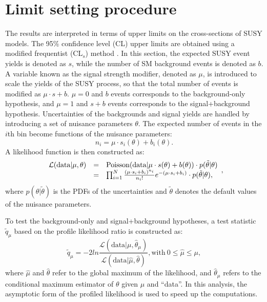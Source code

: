 \documentclass[thesis.tex]{subfiles}
\renewcommand\_{\textunderscore\allowbreak}
\begin{document}
\section{Limit setting procedure}
The results are interpreted in terms of upper limits on the cross-sections of SUSY models. 
The 95\% confidence level (CL) upper limits are obtained using a modified frequentist (CL$_s$) method \cite{Junk:1999kv,Read:2002hq,CMS-NOTE-2011-005}.
In this section, the expected SUSY event yields is denoted as $s$, while the number of SM background events is denoted as $b$. 
A variable known as the signal strength modifier, denoted as $\mu$, is introduced to scale the yields of the SUSY process, so that the total number of events is modified as $\mu \cdot s +b$. 
$\mu = 0$ and $b$ events corresponds to the background-only hypothesis, and $\mu = 1$ and $s+b$ events corresponds to the signal+background hypothesis.
Uncertainties of the backgrounds and signal yields are handled by introducing a set of nuisance parameters $\theta$.
The expected number of events in the $i$th bin become functions of the nuisance parameters: 
\begin{equation}
	n_i = \mu \cdot s_i(\theta) + b_i(\theta).
\end{equation}
A likelihood function is then constructed as:
\begin{equation}
	\begin{array}{c c l}
	\mathcal{L}( \text{data}|\mu, \theta) & = & \text{Poisson}(\text{data}|\mu \cdot s(\theta) + b(\theta)) \cdot p(\tilde{\theta} | \theta) \\
							       & = & \prod_{i=1}^N \frac{(\mu \cdot s_i + b_i)^{n_i}}{n_i !} e^{- (\mu \cdot s_i + b_i) } \cdot p(\tilde{\theta} | \theta),
	\end{array},
\end{equation}
where $p(\theta | \tilde{\theta})$ is the PDFs of the uncertainties and $\tilde{\theta}$ denotes the default values of the nuisance parameters. 

To test the background-only and signal+background hypotheses, a test statistic $\tilde{q}_\mu$ based on the profile likelihood ratio is constructed as:
\begin{equation}
	\tilde{q}_\mu = -2 ln \frac{\mathcal{L}( \text{data}|\mu, \hat{\theta}_\mu)}{\mathcal{L}( \text{data}|\hat{\mu}, \hat{\theta})}, \text{with}\  0 \le \hat{\mu} \le \mu, 
\end{equation}
where $\hat{\mu}$ and $\hat{\theta}$ refer to the global maximum of the likelihood, and $\hat{\theta}_\mu$ refers to the conditional maximum estimator of $\theta$ given $\mu$ and ``data''. 
In this analysis, the asymptotic form of the profiled likelihood \cite{Cowan2011} is used to speed up the computations. 
\end{document}
